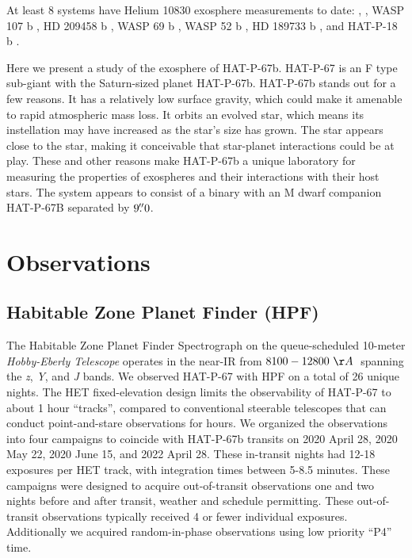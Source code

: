 \documentclass[twocolumn]{aastex631}
\begin{document}
At least 8 systems have Helium 10830 exosphere measurements to date:  \citep{2020ApJ...894...97N, 2021A&A...647A.129L},  \citep{2022AJ....163...68Z}, WASP 107 b \citep{2019A&A...623A..58A,2020AJ....159..115K}, HD 209458 b \citep{2019A&A...629A.110A}, WASP 69 b \citep{2020AJ....159..278V}, WASP 52 b \citep{2020AJ....159..278V}, HD 189733 b \citep{2021A&A...647A.129L}, and HAT-P-18 b \citep{2021ApJ...909L..10P}.


Here we present a study of the exosphere of HAT-P-67b.  HAT-P-67 is an F type sub-giant with the Saturn-sized planet HAT-P-67b.  HAT-P-67b stands out for a few reasons.  It has a relatively low surface gravity, which could make it amenable to rapid atmospheric mass loss.  It orbits an evolved star, which means its instellation may have increased as the star's size has grown.  The star appears close to the star, making it conceivable that star-planet interactions could be at play.  These and other reasons make HAT-P-67b a unique laboratory for measuring the properties of exospheres and their interactions with their host stars.  The system appears to consist of a binary with an M dwarf companion HAT-P-67B separated by $9\mbox{$.\!\!^{\prime\prime}$}0$.

\section{Observations}
\subsection{Habitable Zone Planet Finder (HPF)}

The Habitable Zone Planet Finder Spectrograph \citep[HPF][]{2012SPIE.8446E..1SM,2014SPIE.9147E..1GM, 2019Optic...6..233M} on the queue-scheduled 10-meter \emph{Hobby-Eberly Telescope} \citep[HET][]{1998SPIE.3352...34R} operates in the near-IR from $8100-12800~\AA\;$ spanning the \textit{z}, \textit{Y}, and \textit{J} bands. We observed HAT-P-67 with HPF on a total of 26 unique nights.  The HET fixed-elevation design \citep{2007PASP..119..556S} limits the observability of HAT-P-67 to about 1 hour ``tracks'', compared to conventional steerable telescopes that can conduct point-and-stare observations for hours.  We organized the observations into four campaigns to coincide with HAT-P-67b transits on 2020 April 28, 2020 May 22, 2020 June 15, and 2022 April 28.  These in-transit nights had 12-18 exposures per HET track, with integration times between 5-8.5 minutes.  These campaigns were designed to acquire out-of-transit observations one and two nights before and after transit, weather and schedule permitting.  These out-of-transit observations typically received 4 or fewer individual exposures.  Additionally we acquired random-in-phase observations using low priority ``P4'' time.
\end{document}
